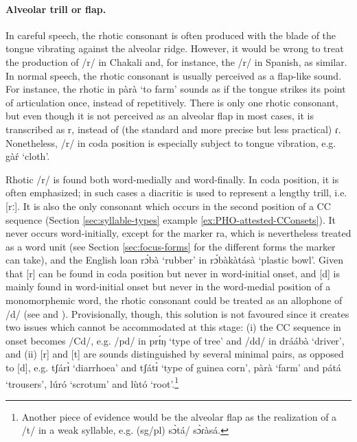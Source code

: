 \newpage 
\paragraph{Alveolar trill or flap.}
\label{sec:flap}
\largerpage
 In careful speech,  the rhotic consonant is often produced with the blade 
of the tongue
vibrating against the alveolar ridge. However,
it would be wrong to treat  the production of /{r}/ in Chakali  and, for 
instance,
the /{r}/ in
Spanish, as similar. In normal speech,  the rhotic consonant is
usually perceived  as a flap-like sound. For instance,  the 
rhotic in {\sls pàrà} `to farm' sounds as if the tongue strikes its point of
articulation once, instead of repetitively. There is only one rhotic consonant,
but  even though it is not perceived as an alveolar flap in most cases, it is
transcribed as {\sls r},  instead of (the standard and more precise but less
practical) {\sls ɾ}.  Nonetheless,   /{r}/ in coda position is especially 
subject to
tongue vibration, e.g. {\sls gàŕ} `cloth'. 

Rhotic /{r}/ is found both word-medially and word-finally. In coda 
position, 
it is often emphasized; in such cases a diacritic is used to represent a lengthy 
trill, i.e. [{rː}]. It is also  the only consonant which occurs in the 
second position of a CC sequence  (Section \ref{sec:syllable-types} example 
\ref{ex:PHO-attested-CConsets}). It never occurs word-initially, except for the 
 marker {\sls ra}, which is nevertheless treated as a word unit (see 
Section 
\ref{sec:focus-forms} for the different forms the  marker can take), and  
the English loan {\sls rɔ́bà} `rubber' in {\sls rɔ́bàkàtásà} `plastic 
bowl'. 
Given that [{r}]  can be found in coda position but never in word-initial 
onset,  and [{d}] is mainly found in word-initial onset but never in the 
word-medial position of a monomorphemic word, the rhotic consonant could be 
treated as an allophone of /{d}/ (see  \citealt[30--31]{Awed02} and 
\citealt[62--64]{Daku02a}). Provisionally, though,  this solution is not favoured since it creates two issues which cannot be accommodated at this stage: (i) the  
CC sequence in onset becomes /Cd/,  e.g. /{pd}/ in {\sls prɪ́ŋ} `type of 
tree' and /{dd}/ in {\sls dráábà} `driver',  and (ii)  [{r}] and 
[{t}] 
are sounds distinguished by several minimal pairs, as opposed to [{d}], 
e.g. 
 {\sls tʃárɪ̀} `diarrhoea' and  {\sls tʃátɪ̀} `type of guinea corn', {\sls 
pàrà} 
`farm' and  {\sls pátá} `trousers',  {\sls lúró} `scrotum' and  {\sls lùtó} 
`root'.\footnote{Another piece of evidence would be the alveolar flap as the 
realization of a {\sls/t/} in a weak syllable, e.g.  ({\sc sg/pl}) {\sls 
sɔ̀tá}/{\sls 
sɔ̀ɾàsá}.}

